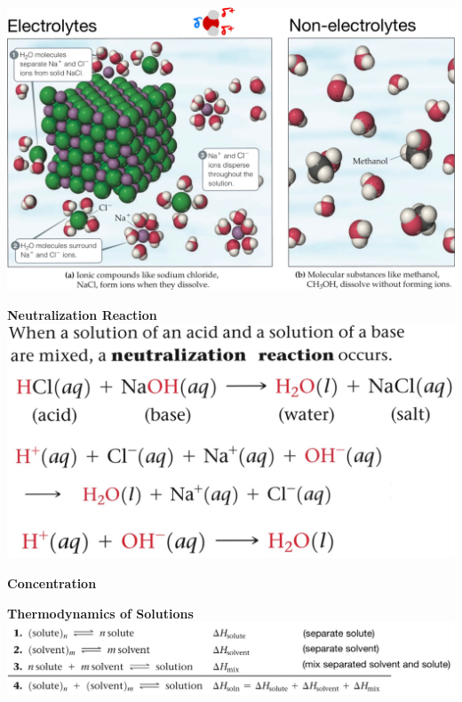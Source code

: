 \begin{minipage}{0.6\linewidth}
    \begin{center}
        \includegraphics[width = 0.9\linewidth]{images/electrolytes_non_electrolytes.jpeg}
    \end{center}
\end{minipage}
\begin{minipage}{0.39\linewidth}
    \begin{center}
    \textbf{Neutralization Reaction}
        \includegraphics[width = \linewidth]{images/neutralization_reaction.jpeg}
    \end{center}
    \textbf{Concentration}\\
\end{minipage}
\textbf{Thermodynamics of Solutions}\\
\includegraphics[width = 0.8\linewidth]{images/solvent_solution.jpeg}
